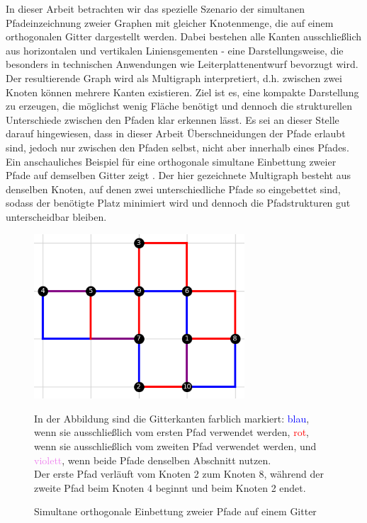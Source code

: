 \documentclass[bachelor, german]{algothesis}
\begin{document}
In dieser Arbeit betrachten wir das spezielle Szenario der simultanen Pfadeinzeichnung zweier Graphen mit gleicher Knotenmenge, die auf einem orthogonalen Gitter dargestellt werden. Dabei bestehen alle Kanten ausschließlich aus horizontalen und vertikalen Liniensgementen - eine Darstellungsweise, die besonders in technischen Anwendungen wie Leiterplattenentwurf bevorzugt wird. Der resultierende Graph wird als Multigraph interpretiert, d.h. zwischen zwei Knoten können mehrere Kanten existieren. Ziel ist es, eine kompakte Darstellung zu erzeugen, die möglichst wenig Fläche benötigt und dennoch die strukturellen Unterschiede zwischen den Pfaden klar erkennen lässt. Es sei an dieser Stelle darauf hingewiesen, dass in dieser Arbeit Überschneidungen der Pfade erlaubt sind, jedoch nur zwischen den Pfaden selbst, nicht aber innerhalb eines Pfades.
Ein anschauliches Beispiel für eine orthogonale simultane Einbettung zweier Pfade auf demselben Gitter zeigt . Der hier gezeichnete Multigraph besteht aus denselben Knoten, auf denen zwei unterschiedliche Pfade so eingebettet sind, sodass der benötigte Platz minimiert wird und dennoch die Pfadstrukturen gut unterscheidbar bleiben.
\begin{figure}[H]
    \begin{minipage}{0.5\textwidth}
    \centering
    \includegraphics[width=0.7\textwidth]{figures/Simultaneous.png}
    \caption{Simultane orthogonale Einbettung zweier Pfade auf einem Gitter}
    \label{fig:simultaneous}
    \end{minipage}
    \begin{minipage}{0.5\textwidth}
    \small
        In der Abbildung sind die Gitterkanten farblich markiert: \textcolor{blue}{blau}, wenn sie ausschließlich vom ersten Pfad verwendet werden, \textcolor{red}{rot}, wenn sie ausschließlich vom zweiten Pfad verwendet werden, und \textcolor{violet}{violett}, wenn beide Pfade denselben Abschnitt nutzen. \\
        Der erste Pfad verläuft vom Knoten 2 zum Knoten 8, während der zweite Pfad beim Knoten 4 beginnt und beim Knoten 2 endet.
    \end{minipage}
\end{figure}
\end{document}
